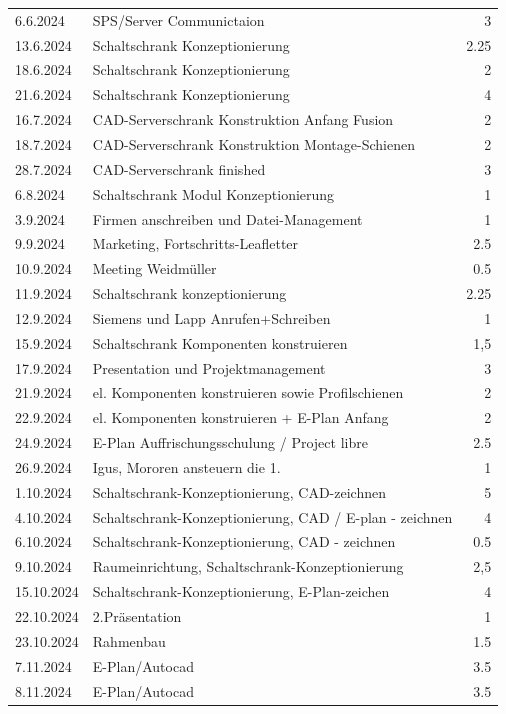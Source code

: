 \begin{longtable}{|l|p{10cm}|r|}
6.6.2024	&	SPS/Server Communictaion	&	3	\\
13.6.2024	&	Schaltschrank Konzeptionierung	&	2.25	\\
18.6.2024	&	Schaltschrank Konzeptionierung	&	2	\\
21.6.2024	&	Schaltschrank Konzeptionierung	&	4	\\
16.7.2024	&	CAD-Serverschrank Konstruktion Anfang Fusion	&	2	\\
18.7.2024	&	CAD-Serverschrank Konstruktion Montage-Schienen	&	2	\\
28.7.2024	&	CAD-Serverschrank finished	&	3	\\
6.8.2024	&	Schaltschrank Modul Konzeptionierung	&	1	\\
3.9.2024	&	Firmen anschreiben und Datei-Management	&	1	\\
9.9.2024	&	Marketing, Fortschritts-Leafletter	&	2.5	\\
10.9.2024	&	Meeting Weidmüller	&	0.5	\\
11.9.2024	&	Schaltschrank konzeptionierung 	&	2.25	\\
12.9.2024	&	Siemens und Lapp Anrufen+Schreiben	&	1	\\
15.9.2024	&	Schaltschrank Komponenten konstruieren	&	1,5	\\
17.9.2024	&	Presentation und Projektmanagement	&	3	\\
21.9.2024	&	el. Komponenten konstruieren sowie Profilschienen	&	2	\\
22.9.2024	&	el. Komponenten konstruieren + E-Plan Anfang	&	2	\\
24.9.2024	&	E-Plan Auffrischungsschulung / Project libre	&	2.5	\\
26.9.2024	&	Igus, Mororen ansteuern die 1.	&	1	\\
1.10.2024	&	Schaltschrank-Konzeptionierung, CAD-zeichnen	&	5	\\
4.10.2024	&	Schaltschrank-Konzeptionierung, CAD / E-plan - zeichnen	&	4	\\
6.10.2024	&	Schaltschrank-Konzeptionierung, CAD - zeichnen	&	0.5	\\
9.10.2024	&	Raumeinrichtung, Schaltschrank-Konzeptionierung	&	2,5	\\
15.10.2024	&	Schaltschrank-Konzeptionierung, E-Plan-zeichen	&	4	\\
22.10.2024	&	 2.Präsentation	&	1	\\
23.10.2024	&	Rahmenbau	&	1.5	\\
7.11.2024	&	E-Plan/Autocad	&	3.5	\\
8.11.2024	&	E-Plan/Autocad	&	3.5	\\

\end{longtable}
